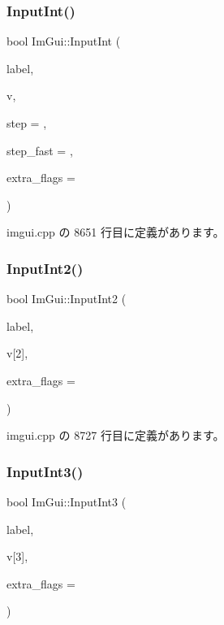 \subsubsection{\texorpdfstring{Input\+Int()}{InputInt()}}
{\footnotesize\ttfamily bool Im\+Gui\+::\+Input\+Int (\begin{DoxyParamCaption}\item[{const char $\ast$}]{label,  }\item[{int $\ast$}]{v,  }\item[{int}]{step = {},  }\item[{int}]{step\+\_\+fast = {},  }\item[{\mbox{\hyperlink{imgui_8h_a7d2c6153a6b9b5d3178ce82434ac9fb8}{Im\+Gui\+Input\+Text\+Flags}}}]{extra\+\_\+flags = {} }\end{DoxyParamCaption})}



 imgui.\+cpp の 8651 行目に定義があります。

\mbox{\label{namespace_im_gui_a4142cc4545d789d76d51dee61c959a03}} 
\subsubsection{\texorpdfstring{Input\+Int2()}{InputInt2()}}
{\footnotesize\ttfamily bool Im\+Gui\+::\+Input\+Int2 (\begin{DoxyParamCaption}\item[{const char $\ast$}]{label,  }\item[{int}]{v\mbox{[}2\mbox{]},  }\item[{\mbox{\hyperlink{imgui_8h_a7d2c6153a6b9b5d3178ce82434ac9fb8}{Im\+Gui\+Input\+Text\+Flags}}}]{extra\+\_\+flags = {} }\end{DoxyParamCaption})}



 imgui.\+cpp の 8727 行目に定義があります。

\mbox{\label{namespace_im_gui_ab02fc4a19ed153984d3585296e1c74b1}} 
\subsubsection{\texorpdfstring{Input\+Int3()}{InputInt3()}}
{\footnotesize\ttfamily bool Im\+Gui\+::\+Input\+Int3 (\begin{DoxyParamCaption}\item[{const char $\ast$}]{label,  }\item[{int}]{v\mbox{[}3\mbox{]},  }\item[{\mbox{\hyperlink{imgui_8h_a7d2c6153a6b9b5d3178ce82434ac9fb8}{Im\+Gui\+Input\+Text\+Flags}}}]{extra\+\_\+flags = {} }\end{DoxyParamCaption})}




